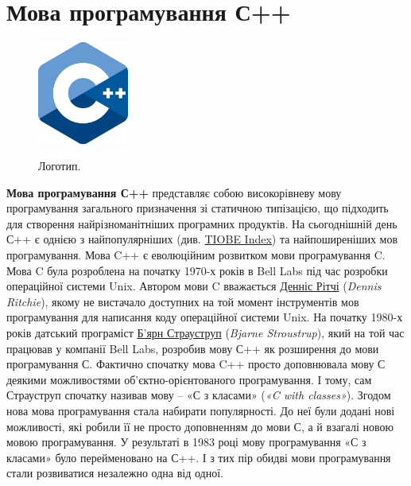 \section{Мова програмування С++}

\begin{figure}
	\includegraphics[width=3cm]{ISO_C++_Logo.svg.png}\\
	\caption{\label{fig:frog1} Логотип.}
\end{figure} 
\textbf{Мова програмування С++} представляє собою високорівневу мову програмування загального призначення зі статичною типізацією, що підходить для створення найрізноманітніших програмних продуктів. На сьогоднішній день С++ є однією з найпопулярніших (див. \href{https://www.tiobe.com/tiobe-index/}{TIOBE Index}) та найпоширеніших мов програмування.
Мова C++ є еволюційним розвитком мови програмування C. Мова C була розроблена на початку 1970-х років в Bell Labs під час розробки операційної системи Unix. Автором мови C вважається \href{https://uk.wikipedia.org/wiki/%D0%94%D0%B5%D0%BD%D0%BD%D1%96%D1%81_%D0%A0%D1%96%D1%82%D1%87%D1%96}{Денніс Рітчі} (\textit{Dennis Ritchie}), якому не вистачало доступних на той момент інструментів мов програмування для написання коду операційної системи Unix. На початку 1980-х років датський програміст \href{https://uk.wikipedia.org/wiki/%D0%91%27%D1%8F%D1%80%D0%BD_%D0%A1%D1%82%D1%80%D0%B0%D1%83%D1%81%D1%82%D1%80%D1%83%D0%BF}{Б’ярн Страуструп} (\textit{Bjarne Stroustrup}), який на той час працював у компанії Bell Labs, розробив мову С++ як розширення до мови програмування С. Фактично спочатку мова C++ просто доповнювала мову С деякими можливостями об'єктно-орієнтованого програмування. І тому, сам Страуструп спочатку називав мову – «С з класами» (\textit{«C with classes»}). Згодом нова мова програмування стала набирати популярності. До неї були додані нові можливості, які робили її не просто доповненням до мови С, а й взагалі новою мовою програмування. У результаті в 1983 році мову програмування «С з класами» було перейменовано на С++. І з тих пір обидві мови програмування стали розвиватися незалежно одна від одної.

